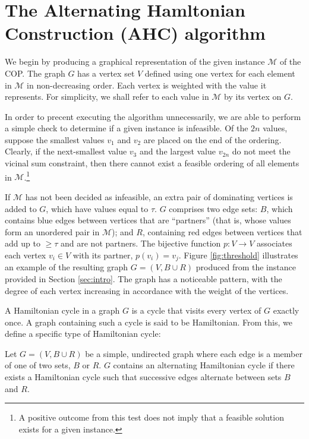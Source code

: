 \documentclass{elsarticle}
\begin{document}
\section{The Alternating Hamltonian Construction (AHC) algorithm}
\label{sec:ahc}
We begin by producing a graphical representation of the given instance $\mathcal{M}$ of the COP. The graph $G$ has a vertex set $V$ defined using one vertex for each element in $\mathcal{M}$ in non-decreasing order. Each vertex is weighted with the value it represents. For simplicity, we shall refer to each value in $\mathcal{M}$ by its vertex on $G$.

In order to precent executing the algorithm unnecessarily, we are able to perform a simple check to determine if a given instance is infeasible. Of the $2n$ values, suppose the smallest values $v_1$ and $v_2$ are placed on the end of the ordering. Clearly, if the next-smallest value $v_3$ and the largest value $v_{2n}$ do not meet the vicinal sum constraint, then there cannot exist a feasible ordering of all elements in $\mathcal{M}$.\footnote{A positive outcome from this test does not imply that a feasible solution exists for a given instance.}

If $\mathcal{M}$ has not been decided as infeasible, an extra pair of dominating vertices is added to $G$, which have values equal to $\tau$. $G$ comprises two edge sets: $B$, which contains blue edges between vertices that are ``partners'' (that is, whose values form an unordered pair in $\mathcal{M}$); and $R$, containing red edges between vertices that add up to $\geq \tau$ and are not partners. The bijective function $p : V \to V$ associates each vertex $v_i \in V$ with its partner, $p(v_i) = v_j$. Figure \ref{fig:threshold} illustrates an example of the resulting graph $G = (V, B \cup R)$ produced from the instance provided in Section \ref{sec:intro}. The graph has a noticeable pattern, with the degree of each vertex increasing in accordance with the weight of the vertices.

A Hamiltonian cycle in a graph $G$ is a cycle that visits every vertex of $G$ exactly once. A graph containing such a cycle is said to be Hamiltonian. From this, we define a specific type of Hamiltonian cycle:

\begin{definition}
	\label{defn:althamcycle}
	Let $G = (V, B \cup R)$ be a simple, undirected graph where each edge is a member of one of two sets, $B$ or $R$. $G$ contains an alternating Hamiltonian cycle if there exists a Hamiltonian cycle such that successive edges alternate between sets $B$ and $R$.
\end{definition}
\end{document}
